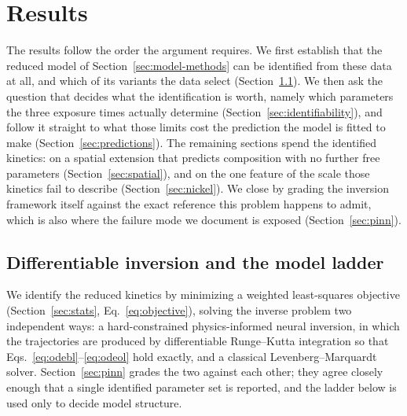 \documentclass[pdflatex,sn-nature]{sn-jnl}
\begin{document}
\section{Results}\label{sec:results}

The results follow the order the argument requires. We first establish
that the reduced model of Section~\ref{sec:model-methods} can be
identified from these data at all, and which of its variants the data
select (Section~\ref{sec:ladder}). We then ask the question that decides
what the identification is worth, namely which parameters the three
exposure times actually determine
(Section~\ref{sec:identifiability}), and follow it straight to what
those limits cost the prediction the model is fitted to make
(Section~\ref{sec:predictions}). The remaining sections spend the
identified kinetics: on a spatial extension that predicts composition
with no further free parameters (Section~\ref{sec:spatial}), and on the
one feature of the scale those kinetics fail to describe
(Section~\ref{sec:nickel}). We close by grading the inversion framework
itself against the exact reference this problem happens to admit, which
is also where the failure mode we document is exposed
(Section~\ref{sec:pinn}).

\subsection{Differentiable inversion and the model ladder}\label{sec:ladder}

We identify the reduced kinetics by minimizing a weighted least-squares
objective (Section~\ref{sec:stats}, Eq.~\eqref{eq:objective}), solving
the inverse problem two independent ways: a hard-constrained
physics-informed neural inversion, in which the trajectories are produced
by differentiable Runge--Kutta integration so that
Eqs.~\eqref{eq:odebl}--\eqref{eq:odeol} hold exactly, and a classical
Levenberg--Marquardt solver. Section~\ref{sec:pinn} grades the two
against each other; they agree closely enough that a single identified
parameter set is reported, and the ladder below is used only to decide
model structure.
\end{document}

